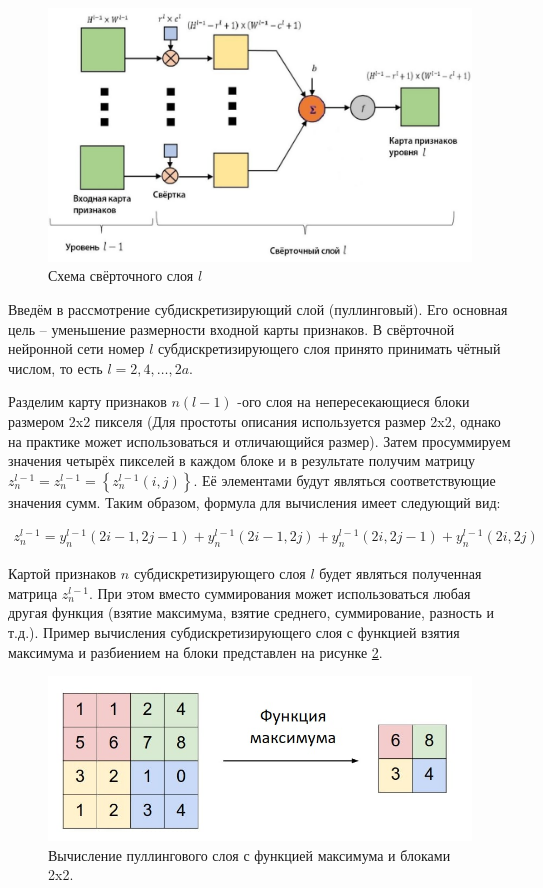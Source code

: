 \begin{figure}[h]
\includegraphics[width=0.75\columnwidth]{./img/recur_8.jpg}
\centering
\caption{Схема свёрточного слоя $l$}
\label{pic:recur_8}
\end{figure}

Введём в рассмотрение субдискретизирующий слой (пуллинговый). Его основная цель – уменьшение размерности входной карты признаков. 
В свёрточной нейронной сети номер $l$ субдискретизирующего слоя принято принимать чётный числом, то есть $l=2,4,…,2a$.

Разделим карту признаков $n (l-1)$ -ого слоя на непересекающиеся блоки размером 2x2 пикселя 
(Для простоты описания используется размер 2x2, однако на практике может использоваться и отличающийся размер). 
Затем просуммируем значения четырёх пикселей в каждом блоке и в результате получим матрицу $z_n^{l-1} = z_n^{l-1} = \left\{ z_n^{l-1}(i,j)\right\}$. 
Её элементами будут являться соответствующие значения сумм. 
Таким образом, формула для вычисления имеет следующий вид:

\begin{equation}
  \begin{gathered}
    z_n^{l-1} = y_n^{l-1}(2i - 1,2j - 1) + y_n^{l-1}(2i - 1,2j) + y_n^{l-1}(2i,2j - 1) + y_n^{l-1}(2i,2j)
  \end{gathered}
  \label{eq:speach_formula_9}
\end{equation}

Картой признаков $n$ субдискретизирующего слоя $l$ будет являться полученная матрица $z_n^{l-1}$. 
При этом вместо суммирования может использоваться любая другая функция (взятие максимума, взятие среднего, суммирование, разность и т.д.). 
Пример вычисления субдискретизирующего слоя с функцией взятия максимума и разбиением на блоки представлен на рисунке \ref{pic:recur_9}.

\begin{figure}[h]
\includegraphics[width=0.75\columnwidth]{./img/recur_9.jpg}
\centering
\caption{Вычисление пуллингового слоя с функцией максимума и блоками 2x2. \cite{8_recur}}
\label{pic:recur_9}
\end{figure}

